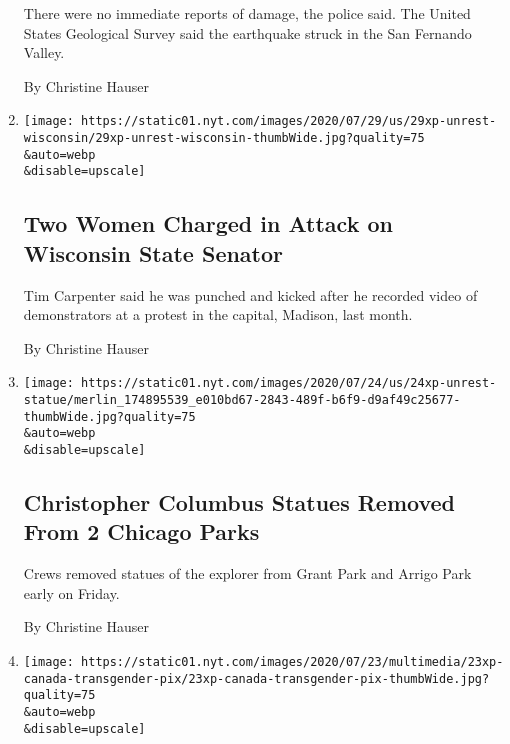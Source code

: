 \begin{enumerate}
  There were no immediate reports of damage, the police said. The United
  States Geological Survey said the earthquake struck in the San
  Fernando Valley.

  By Christine Hauser
\item
  \href{/2020/07/29/us/wisconsin-tim-carpenter-attacked.html}{}

  \texttt{[image: https://static01.nyt.com/images/2020/07/29/us/29xp-unrest-wisconsin/29xp-unrest-wisconsin-thumbWide.jpg?quality=75\\\&auto=webp\\\&disable=upscale]}

  \hypertarget{two-women-charged-in-attack-on-wisconsin-state-senator}{%
  \subsection{Two Women Charged in Attack on Wisconsin State
  Senator}\label{two-women-charged-in-attack-on-wisconsin-state-senator}}

  Tim Carpenter said he was punched and kicked after he recorded video
  of demonstrators at a protest in the capital, Madison, last month.

  By Christine Hauser
\item
  \href{/2020/07/24/us/christopher-columbus-chicago.html}{}

  \texttt{[image: https://static01.nyt.com/images/2020/07/24/us/24xp-unrest-statue/merlin\_174895539\_e010bd67-2843-489f-b6f9-d9af49c25677-thumbWide.jpg?quality=75\\\&auto=webp\\\&disable=upscale]}

  \hypertarget{christopher-columbus-statues-removed-from-2-chicago-parks}{%
  \subsection{Christopher Columbus Statues Removed From 2 Chicago
  Parks}\label{christopher-columbus-statues-removed-from-2-chicago-parks}}

  Crews removed statues of the explorer from Grant Park and Arrigo Park
  early on Friday.

  By Christine Hauser
\item
  \href{/2020/07/23/world/canada/junia-joplin-transgender-lorne-park-baptist.html}{}

  \texttt{[image: https://static01.nyt.com/images/2020/07/23/multimedia/23xp-canada-transgender-pix/23xp-canada-transgender-pix-thumbWide.jpg?quality=75\\\&auto=webp\\\&disable=upscale]}

  \hypertarget{baptist-pastor-is-fired-after-coming-out-as-transgender}{%
}
\end{enumerate}
